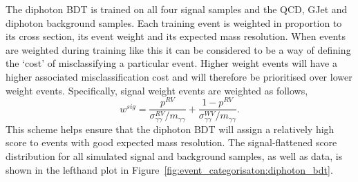 The diphoton BDT is trained on all four signal samples and the QCD, GJet and diphoton background samples. 
Each training event is weighted in proportion to its cross section, its event weight and its expected mass resolution. 
When events are weighted during training like this it can be considered to be a way of defining the `cost' of misclassifying a particular event. Higher weight events will have a higher associated misclassification cost and will therefore be prioritised over lower weight events. 
Specifically, signal weight events are weighted as follows,
\begin{equation}
    w^{sig} = \frac{p^{RV}}{\sigma^{RV}_{\gamma\gamma}/m_{\gamma\gamma}} + \frac{1-p^{RV}}{\sigma^{WV}_{\gamma\gamma}/m_{\gamma\gamma}}.
\end{equation}
This scheme helps ensure that the diphoton BDT will assign a relatively high score to events with good expected mass resolution. 
The signal-flattened score distribution for all simulated signal and background samples, as well as data, is shown in the lefthand plot in Figure~\ref{fig:event_categorisaton:diphoton_bdt}. 

